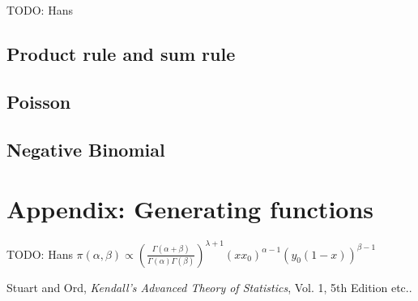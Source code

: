 \documentclass[11pt]{article}
\begin{document}
TODO: Hans

\subsection{Product rule and sum rule}

\subsection{Poisson}

\subsection{Negative Binomial}

\section{Appendix: Generating functions}

TODO: Hans
$\pi(\alpha, \beta) \propto \left( \frac{\Gamma(\alpha+\beta)}{\Gamma(\alpha) \Gamma(\beta)} \right)^{\lambda +1} (x x_0)^{\alpha-1} \left(y_0 (1-x) \right)^{\beta-1}$



\begin{thebibliography}{99}
Stuart and Ord, \textit{Kendall's Advanced Theory of Statistics},
  Vol. 1, 5th Edition etc..

\end{thebibliography}


\end{document}
